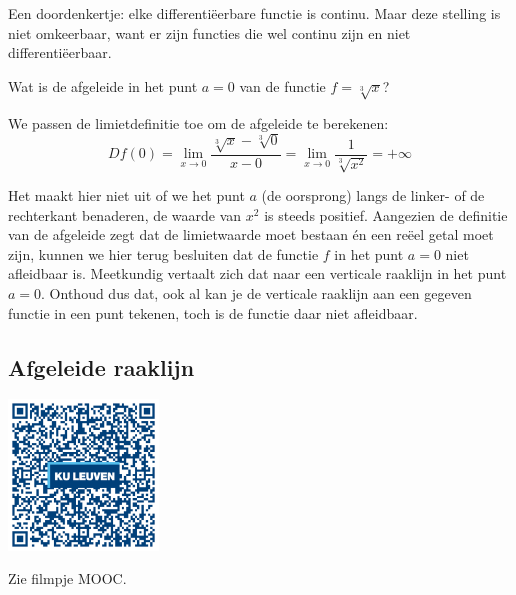 Een doordenkertje: elke differentiëerbare functie is continu. Maar
deze stelling is niet omkeerbaar, want er zijn functies die wel continu
zijn en niet differentiëerbaar.\medskip{}


\begin{voorbeeld}
	Wat is de afgeleide in het punt $a=0$ van de functie
$f=\sqrt[3]{x}$? 


\begin{center}
	
\end{center}

We passen de limietdefinitie toe om de afgeleide
te berekenen:
\[
Df(0)={\displaystyle \lim_{x\to0}}\frac{\sqrt[3]{x}-\sqrt[3]{0}}{x-0}={\displaystyle \lim_{x\to0}}\frac{1}{\sqrt[3]{x^{2}}}=+\infty
\]

Het maakt hier niet uit of we het punt $a$ (de oorsprong) langs de
linker- of de rechterkant benaderen, de waarde van $x^{2}$ is steeds
positief. Aangezien de definitie van de afgeleide zegt dat de limietwaarde
moet bestaan én een reëel getal moet zijn, kunnen we hier terug besluiten
dat de functie $f$ in het punt $a=0$ niet afleidbaar is. Meetkundig
vertaalt zich dat naar een verticale raaklijn in het punt $a=0$.
Onthoud dus dat, ook al kan je de verticale raaklijn aan een gegeven
functie in een punt tekenen, toch is de functie daar niet afleidbaar.\medskip{}

\end{voorbeeld}



\subsection{Afgeleide raaklijn}

\begin{minipage}{.25\linewidth}
	\raggedright
	\includegraphics[width=4cm]{6_afgeleiden_integralen/inputs/QR_Code_AFGRAAKLIJN_module6new}
\end{minipage}
\begin{minipage}{.7\linewidth}
	Zie filmpje MOOC.
\end{minipage}


